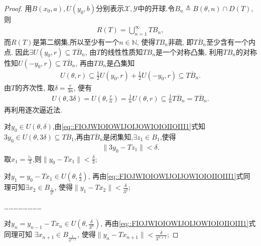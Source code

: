 \documentclass[../../main.tex]{subfiles}%
\begin{document}
\begin{proof}
用$B(x_0,a),U(y_0,b)$分别表示$\mathscr{X},\mathscr{Y}$中的开球.令$B_n\triangleq B(\theta,n)\cap D(T)$,则
\begin{align*}
R(T)=\bigcup\limits_{n=1}^{\infty}TB_n,
\end{align*}
而$R(T)$是第二纲集,所以至少有一个$n\in\mathbb{N}$, 使得$TB_n$非疏, 即$\overline{TB_n}$至少含有一个内点. 因此$\exists U(y_0,r)\subseteq\overline{TB_n}$, 由$T$的线性性质知$TB_n$是一个对称凸集, 利用$TB_n$的对称性知$U(-y_0,r)\subseteq\overline{TB_n}$, 再由$TB_n$是凸集知
\begin{align*}
U(\theta,r)\subseteq\frac{1}{2}U(y_0,r)+\frac{1}{2}U(-y_0,r)\subseteq\overline{TB_n}.
\end{align*}
由$T$的齐次性, 取$\delta=\frac{r}{3n}$, 便有
\begin{align}\label{eq::FIOJWIOIOWIJOIJOWIOIOIIOIII1}
U\left( \theta ,3\delta \right) =U\left( \theta ,\frac{r}{n} \right) =\frac{1}{n}U\left( \theta ,r \right) \subseteq \frac{1}{n}\overline{TB_n }=\overline{TB_n }.
\end{align}
再利用逐次逼近法.

对$y_0\in U(\theta,\delta)$,由\eqref{eq::FIOJWIOIOWIJOIJOWIOIOIIOIII1}式知$3y_0\in U(\theta,3\delta)\subseteq \overline{TB_1}$,再由$\overline{TB_n}$是闭集知,$\exists z_1\in B_1$,使得
\begin{align*}
\|3y_0-Tz_1\|<\delta.
\end{align*}
取$x_1=\frac{z_1}{3}$,则$\|y_0-Tx_1\|<\frac{\delta}{3}$;

对$y_1=y_0-Tx_1\in U\left(\theta,\frac{\delta}{3}\right)$, 再由\eqref{eq::FIOJWIOIOWIJOIJOWIOIOIIOIII1}式同理可知$\exists x_2\in B_{\frac{1}{3^2}}$, 使得$\|y_1-Tx_2\|<\frac{\delta}{3^2}$;

……………………

对$y_n=y_{n-1}-Tx_n\in U\left(\theta,\frac{\delta}{3^n}\right)$, 再由\eqref{eq::FIOJWIOIOWIJOIJOWIOIOIIOIII1}式同理可知 $\exists x_{n+1}\in B_{\frac{1}{3^{n+1}}}$, 使得$\|y_n-Tx_{n+1}\|<\frac{\delta}{3^{n+1}}$;


\end{proof}
\end{document}
